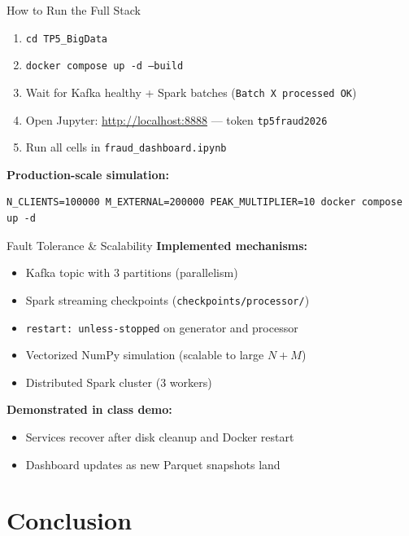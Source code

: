 \documentclass[aspectratio=169,11pt]{beamer}
\begin{document}
\begin{frame}{How to Run the Full Stack}
  \begin{enumerate}
    \item \texttt{cd TP5\_BigData}
    \item \texttt{docker compose up -d --build}
    \item Wait for Kafka healthy + Spark batches (\texttt{Batch X processed OK})
    \item Open Jupyter: \url{http://localhost:8888} — token \texttt{tp5fraud2026}
    \item Run all cells in \texttt{fraud\_dashboard.ipynb}
  \end{enumerate}
  \vspace{0.4em}
  \textbf{Production-scale simulation:}
  \begin{lstlisting}[style=py,basicstyle=\ttfamily\footnotesize]
N_CLIENTS=100000 M_EXTERNAL=200000 PEAK_MULTIPLIER=10 docker compose up -d
  \end{lstlisting}
\end{frame}

\begin{frame}{Fault Tolerance \& Scalability}
  \textbf{Implemented mechanisms:}
  \begin{itemize}
    \item Kafka topic with 3 partitions (parallelism)
    \item Spark streaming checkpoints (\texttt{checkpoints/processor/})
    \item \texttt{restart: unless-stopped} on generator and processor
    \item Vectorized NumPy simulation (scalable to large $N{+}M$)
    \item Distributed Spark cluster (3 workers)
  \end{itemize}
  \vspace{0.4em}
  \textbf{Demonstrated in class demo:}
  \begin{itemize}
    \item Services recover after disk cleanup and Docker restart
    \item Dashboard updates as new Parquet snapshots land
  \end{itemize}
\end{frame}

\section{Conclusion}
\end{document}
